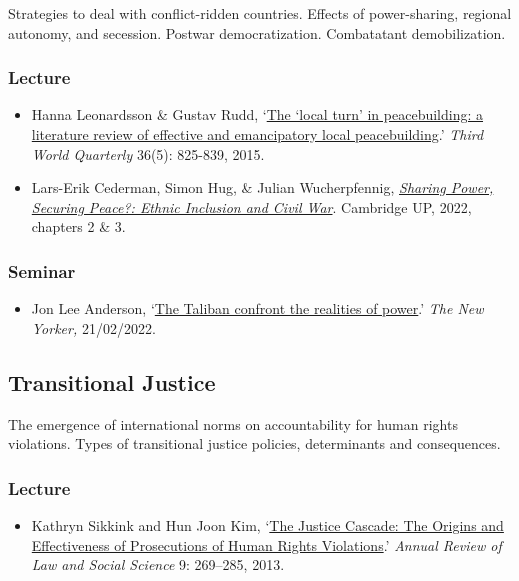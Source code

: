\documentclass[12pt, a4paper]{article}
\begin{document}
Strategies to deal with conflict-ridden countries. Effects of power-sharing, regional autonomy, and secession. Postwar democratization. Combatatant demobilization.

\subsubsection*{Lecture}

\begin{itemize}
\setlength\itemsep{0pt}
\item Hanna Leonardsson \& Gustav Rudd, `\href{https://doi.org/10.1080/01436597.2015.1029905}{The ‘local turn’ in peacebuilding: a literature review of effective and emancipatory local peacebuilding}.' \textit{Third World Quarterly} 36(5): 825-839, 2015.
\item Lars-Erik Cederman, Simon Hug, \& Julian Wucherpfennig, \href{https://doi.org/10.1017/9781108284639}{\textit{Sharing Power, Securing Peace?: Ethnic Inclusion and Civil War}}. Cambridge UP, 2022, chapters 2 \& 3.
\end{itemize}

\subsubsection*{Seminar}

\begin{itemize}
\setlength\itemsep{0pt}
\item Jon Lee Anderson, `\href{https://www.newyorker.com/magazine/2022/02/28/the-taliban-confront-the-realities-of-power-afghanistan}{The Taliban confront the realities of power}.' \textit{The New Yorker,} 21/02/2022.
\end{itemize}


\hline %

\subsection{Transitional Justice}\label{tj}

The emergence of international norms on accountability for human rights violations. Types of transitional justice policies, determinants and consequences.

\subsubsection*{Lecture}

\begin{itemize}
\setlength\itemsep{0pt}
\item Kathryn Sikkink and Hun Joon Kim, `\href{https://doi.org/10.1146/annurev-lawsocsci-102612-133956}{The Justice Cascade: The Origins and Effectiveness of Prosecutions of Human Rights Violations}.' \textit{Annual Review of Law and Social Science} 9: 269--285, 2013.
\end{itemize}
\end{document}
